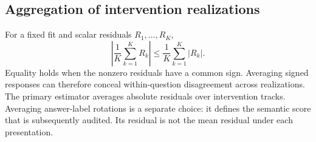 \subsection{Aggregation of intervention realizations}
For a fixed fit and scalar residuals $R_1,\ldots,R_K$,
\begin{equation}
\left|\frac1K\sum_{k=1}^KR_k\right|
\leq \frac1K\sum_{k=1}^K|R_k|.
\end{equation}
Equality holds when the nonzero residuals have a common sign. Averaging signed responses can therefore conceal within-question disagreement across realizations. The primary estimator averages absolute residuals over intervention tracks. Averaging answer-label rotations is a separate choice: it defines the semantic score that is subsequently audited. Its residual is not the mean residual under each presentation.
